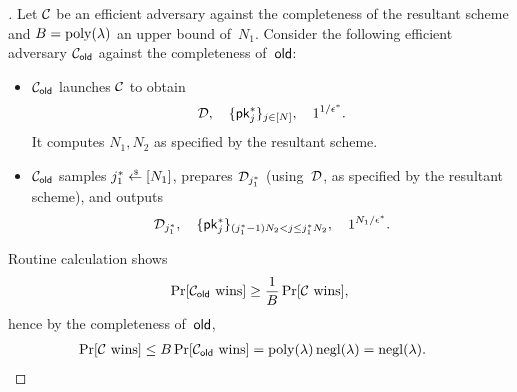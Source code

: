 \begin{proof}[]
Let ${\mathcal{C}}$ be an efficient adversary against the completeness of the resultant scheme and
${B=\operatorname{poly}(\lambda)}$ an upper bound of~$N_1$.
Consider the following efficient adversary $\scriptC_\OLD$ against the completeness of~$\OLD$:
\begin{itemize}
\item $\scriptC_\OLD$ launches ${\mathcal{C}}$ to obtain
\begin{align*}
\scriptD,\quad
\{\pk^\ast_j\}_{j\in[N]},\quad
1^{1/\epsilon^\ast}.
\end{align*}
It computes $N_1,N_2$ as specified by the resultant scheme.
\item $\scriptC_\OLD$ samples ${j^\ast_1\draws[N_1]}$,
prepares ${\mathcal{D}}_{j^\ast_1}$ (using~${\mathcal{D}}$, as specified by the resultant scheme), and outputs
\begin{align*}
\scriptD_{j^\ast_1},\quad
\{\pk^\ast_j\}_{(j^\ast_1-1)N_2<j\leq j^\ast_1N_2},\quad
1^{N_1/\epsilon^\ast}.
\end{align*}
\end{itemize}
Routine calculation shows
\begin{align*}
\Pr[\scriptC_\OLD\textup{ wins}]
\geq
\frac{1}{B}\Pr[\scriptC\textup{ wins}],
\end{align*}
hence by the completeness of~$\OLD$,
\begin{align*}
\Pr[\scriptC\textup{ wins}]
&{}\leq
B\Pr[\scriptC_\OLD\textup{ wins}]
=
\poly(\lambda)\negl(\lambda)
=
\negl(\lambda).
\qedhere
\end{align*}
\end{proof}
